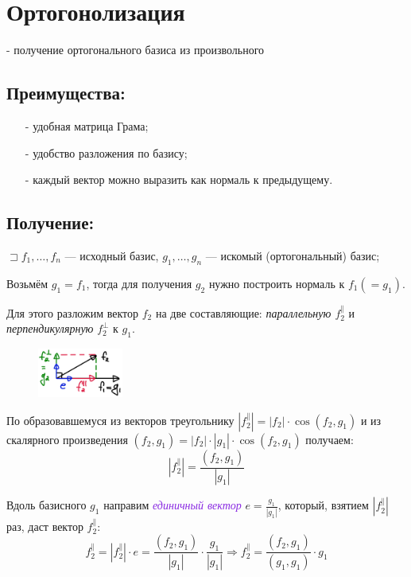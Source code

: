 \documentclass[12pt]{article}
\begin{document}
\section{Ортогонолизация}
- получение ортогонального базиса из произвольного
\subsection*{Преимущества:}
\begin{itemize}
    \item[-] удобная матрица Грама;
    \item[-] удобство разложения по базису;
    \item[-] каждый вектор можно выразить как нормаль к предыдущему.
\end{itemize}\par
\subsection*{Получение:}
\hspace{36pt}
$\sqsupset f_1, \dots, f_n$ --- исходный базис,
$g_1, \dots, g_n$ --- искомый (ортогональный) базис;\par

Возьмём $g_1 = f_1$, тогда
для получения $g_2$ нужно построить нормаль к $f_1 (=g_1)$.

Для этого разложим вектор $f_2$ на две составляющие:
\textit{\textcolor{BrickRed}{параллельную }} $f_2^\parallel$ и
\textit{\textcolor{OliveGreen}{перпендикулярную}} $f_2^\perp$ к $g_1$.
\begin{figure}[h]
    \centering
    \includegraphics[width=0.25\textwidth]{graphics/12_vectors.png}
\end{figure}

По образовавшемуся из векторов треугольнику $|f_2^\parallel| = |f_2| \cdot \cos(f_2, g_1)$
и из скалярного произведения $(f_2, g_1) = |f_2| \cdot |g_1| \cdot \cos(f_2, g_1)$ получаем:
\[|f_2^\parallel| = \frac{(f_2, g_1)}{|g_1|} \]

Вдоль базисного $g_1$ направим
\textit{\textcolor{BlueViolet}{единичный вектор}} $e = \frac{g_1}{|g_1|}$,
который, взятием $|f_2^\parallel|$ раз, даст вектор $f_2^\parallel$:
\[f_2^\parallel = |f_2^\parallel| \cdot e =
    \frac{(f_2, g_1)}{|g_1|} \cdot \frac{g_1}{|g_1|} \Rightarrow
    f_2^\parallel = \frac{(f_2, g_1)}{(g_1, g_1)} \cdot g_1\]
\end{document}
